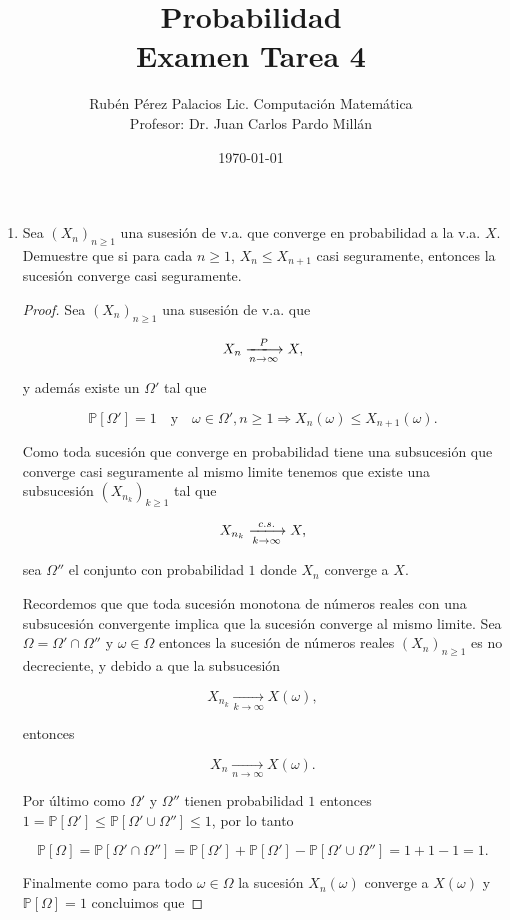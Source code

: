 \documentclass[letterpaper]{article}
\title{Probabilidad \\ Examen Tarea 4}
\author{Rubén Pérez Palacios Lic. Computación Matemática\\Profesor: Dr. Juan Carlos Pardo Millán}
\date{\today}
\theoremstyle{definition}
\theoremstyle{lemathm}
\theoremstyle{lemathm}
\theoremstyle{lemathm}
\theoremstyle{lemademthm}
\newcommand{\pars}[1]{\left( #1 \right) }
\newcommand{\bracs}[1]{\left[ #1 \right] }
\newcommand{\PP}{\mathbb{P}}
\newcommand{\1}{\mathbbm{1}}
\begin{document}
	\maketitle

	\begin{enumerate}
		\item Sea $\pars{X_n}_{n\geq 1}$ una susesión de v.a. que converge en probabilidad a la v.a. $X$. Demuestre que si para cada $n\geq 1$, $X_n\leq X_{n + 1}$ casi seguramente, entonces la sucesión converge casi seguramente.
		
		\begin{proof}
			Sea $\pars{X_n}_{n\geq 1}$ una susesión de v.a. que 
			
			\[X_n \xlongrightarrow[n\to\infty]{P} X,\]

			y además existe un $\Omega'$ tal que 
			
			\[\PP\bracs{\Omega'} = 1 \quad \text{y} \quad \omega\in\Omega', n\geq 1 \Longrightarrow X_n\pars{\omega} \leq X_{n + 1}\pars{\omega}.\]

			Como toda sucesión que converge en probabilidad tiene una subsucesión que converge casi seguramente al mismo limite tenemos que existe una subsucesión $\pars{X_{n_k}}_{k\geq 1}$ tal que

			\[X_{n_k} \xlongrightarrow[k\to\infty]{c.s.} X,\]

			sea $\Omega''$ el conjunto con probabilidad $1$ donde $X_n$ converge a $X$.

			Recordemos que que toda sucesión monotona de números reales con una subsucesión convergente implica que la sucesión converge al mismo limite. Sea $\Omega = \Omega' \cap \Omega''$ y $\omega \in \Omega$ entonces la sucesión de números reales $\pars{X_n}_{n\geq 1}$ es no decreciente, y debido a que la subsucesión 
			
			\[X_{n_k} \xrightarrow[k\to\infty]{} X(\omega),\]
			
			entonces 
			
			\[X_n \xrightarrow[n\to\infty]{} X(\omega).\]

			Por último como $\Omega'$ y $\Omega''$ tienen probabilidad $1$ entonces $1 = \PP\bracs{\Omega'} \leq \PP\bracs{\Omega' \cup \Omega''} \leq 1$, por lo tanto 
			
			\[\PP\bracs{\Omega} = \PP\bracs{\Omega' \cap \Omega''} = \PP\bracs{\Omega'} + \PP\bracs{\Omega'} - \PP\bracs{\Omega' \cup \Omega''} = 1 + 1 - 1 = 1.\]
			
			Finalmente como para todo $\omega\in\Omega$ la sucesión $X_n(\omega)$ converge a $X(\omega)$ y $\PP\bracs{\Omega} = 1$ concluimos que
			

\end{proof}
\end{enumerate}
\end{document}
